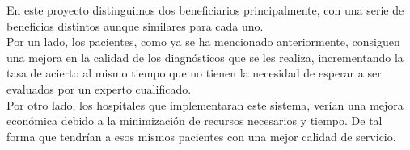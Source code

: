 \documentclass[a4paper,12pt,oneside]{article}
\begin{document}
En este proyecto distinguimos dos beneficiarios principalmente, con una serie de beneficios distintos aunque similares para cada uno. \\

Por un lado, los pacientes, como ya se ha mencionado anteriormente, consiguen una mejora en la calidad de los diagnósticos que se les realiza, incrementando la tasa de acierto al mismo tiempo que no tienen la necesidad de esperar a ser evaluados por un experto cualificado. \\

Por otro lado, los hospitales que implementaran este sistema, verían una mejora económica debido a la minimización de recursos necesarios y tiempo. De tal forma que tendrían a esos mismos pacientes con una mejor calidad de servicio.













\end{document}
